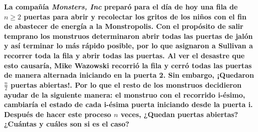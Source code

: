 \textbf{La compañía \textit{Monsters, Inc} preparó para el día de hoy una fila de $n \geq 2$ puertas para abrir y recolectar los gritos de los niños con el fin de abastecer de energía a la Monstropolis. Con el propósito de salir temprano los monstruos determinaron abrir todas las puertas de jalón y así terminar lo más rápido posible, por lo que asignaron a Sullivan a recorrer toda la fila y abrir todas las puertas. Al ver el desastre que esto causaría, Mike Wazowski recorrió la fila y cerró todas las puertas de manera alternada iniciando en la puerta 2. Sin embargo, ¡Quedaron $\frac{n}{2}$ puertas abiertas!. Por lo que el resto de los monstruos decidieron ayudar de la siguiente manera: el monstruo con el recorrido i-ésimo, cambiaría el estado de cada i-ésima puerta iniciando desde la puerta i. Después de hacer este proceso $n$ veces, ¿Quedan puertas abiertas? ¿Cuántas y cuáles son si es el caso?}\vspace{.2cm}

\textcolor{bibi}{}
\begin{quote}
\end{quote}